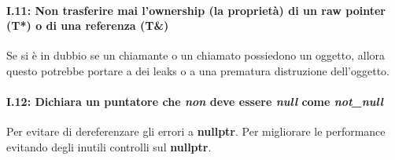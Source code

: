\paragraph{I.11: Non trasferire mai l'ownership (la proprietà) di un raw pointer (T*) o di una referenza (T\&)}

\textsf{\small Se si è in dubbio se un chiamante o un chiamato possiedono un oggetto, allora questo potrebbe portare a dei leaks o a una prematura distruzione dell'oggetto.} \\

\paragraph{I.12: Dichiara un puntatore che \emph{non} deve essere \emph{null} come \emph{not\_null}}

\textsf{\small Per evitare di dereferenzare gli errori a \textbf{nullptr}. Per migliorare le performance evitando degli inutili controlli sul \textbf{nullptr}.} \\

